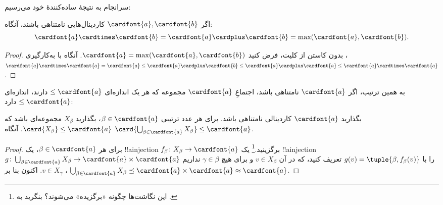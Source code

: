 \documentclass[../../../include/open-logic-section]{subfiles}
\begin{document}
سرانجام به نتیجهٔ ساده‌کنندهٔ خود می‌رسیم:

\begin{thm}
اگر $\cardfont{a}, \cardfont{b}$ کاردینال‌هایی نامتناهی باشند، آنگاه:
\[
	\cardfont{a}
\cardtimes \cardfont{b} = \cardfont{a} \cardplus \cardfont{b} =
\text{max}(\cardfont{a}, \cardfont{b}).
\]
\end{thm}

\begin{proof}
بدون کاستن از کلیت، فرض کنید
$\cardfont{a} = \max(\cardfont{a}, \cardfont{b})$. آنگاه با به‌کارگیری
،
$\cardfont{a}\cardtimes\cardfont{a} = \cardfont{a} \leq \cardfont{a}
\cardplus \cardfont{b} \leq \cardfont{a} \cardplus \cardfont{a} \leq
\cardfont{a} \cardtimes \cardfont{a}$.
\end{proof}\noindent
به همین ترتیب، اگر $\cardfont{a}$ نامتناهی باشد، اجتماعِ
$\cardfont{a}$ مجموعه که هر یک اندازه‌ای $\leq\cardfont{a}$ دارند،
اندازه‌ای $\leq\cardfont{a}$ دارد:

\begin{prop}
بگذارید $\cardfont{a}$ کاردینالی نامتناهی باشد. برای هر عدد ترتیبی
$\beta \in \cardfont{a}$، بگذارید $X_\beta$ مجموعه‌ای باشد که
$\card{X_\beta} \leq \cardfont{a}$. آنگاه
$\card{\bigcup_{\beta \in \cardfont{a}} X_\beta} \leq \cardfont{a}$.
\end{prop}

\begin{proof}
برای هر $\beta \in \cardfont{a}$، یک !!a{injection} $f_\beta \colon
X_\beta \to \cardfont{a}$ برگزینید.\footnote{این نگاشت‌ها چگونه
«برگزیده» می‌شوند؟ بنگرید به .}
یک !!a{injection} $g \colon
\bigcup_{\beta \in \cardfont{a}} X_\beta \to \cardfont{a} \times
\cardfont{a}$ را با $g(v) = \tuple{\beta, f_\beta(v)}$ تعریف کنید، که
در آن $v \in X_\beta$ و برای هیچ $\gamma \in \beta$ نداریم
$v \in X_\gamma$. اکنون بنا بر ،
$\bigcup_{\beta \in \cardfont{a}} X_\beta \preceq
\cardfont{a} \times \cardfont{a} \approx \cardfont{a}$.
\end{proof}
\end{document}
